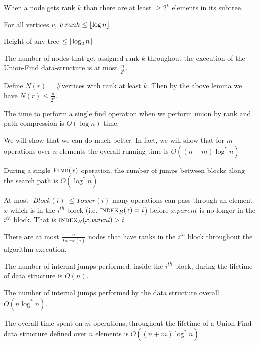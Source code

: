 \begin{lemma}{}{}
	When a node gets rank $k$ than there are at least $\geq 2^k$ elements in its subtree.
\end{lemma}
\begin{corolary}{}{}
	For all vertices $v$, $v.rank\leq \left\lfloor \log n\right\rfloor$
\end{corolary}
\begin{corolary}{}{}
	Height of any tree $\leq \left\lfloor\log _2n\right\rfloor$
\end{corolary}
\begin{lemma}{}{}
	The number of nodes that get assigned rank $k$ throughout the execution of the Union-Find data-structure is at most $\frac{n}{2^k}$.
\end{lemma}
Define $N(r)=\#$vertices with rank at least $k$. Then by the above lemma we have $N(r)\leq \frac{n}{2^k}$.
\begin{lemma}{}{}
	The time to perform a single find operation when we perform union by rank and path
	compression is $O(\log n)$ time.
\end{lemma}
We will show that we can do much better. In fact, we will show that for $m$ operations over $n$ elements the overall running time is $O((n+m)\log ^*n)$

\begin{lemma}{}{}
	During a single $\textsc{Find}(x)$ operation, the number of jumps between blocks along the search path is $O(\log^*n)$.
\end{lemma}
\begin{lemma}{}{}
	At most $|\textit{Block}(i)|\leq \textit{Tower}(i)$ many  operations can pass through an element $x$ which is in the $i^{th}$ block (i.e. $\textsc{index}_B(x)=i$) before $x.\textit{parent}$ is no longer in the $i^{th}$ block. That is $\textsc{index}_B(x.\textit{parent})>i$.
\end{lemma}

\begin{lemma}{}{}
	There are at most $\frac{n}{\textit{Tower}(i)}$ nodes that have ranks in the $i^{th}$ block throughout the algorithm execution.
\end{lemma}

\begin{lemma}{}{}
	The number of internal jumps performed, inside the $i^{th}$ block, during the lifetime of  data structure is $O(n)$.
\end{lemma}

\begin{Theorem}{}{}
	The number of internal jumps performed by the  data structure overall $O(n\log^*n)$.
\end{Theorem}
\begin{Theorem}{}{}
	The overall time spent on $m$  operations, throughout the lifetime of a Union-Find data structure defined over $n$ elements is $O((n+m)\log^*n)$.
\end{Theorem}